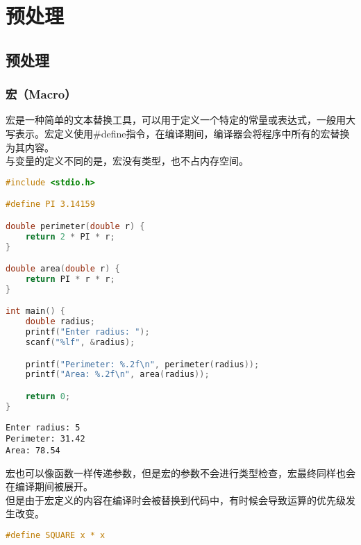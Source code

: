 \chapter{预处理}

\section{预处理}

\subsection{宏（Macro）}

宏是一种简单的文本替换工具，可以用于定义一个特定的常量或表达式，一般用大写表示。宏定义使用\#define指令，在编译期间，编译器会将程序中所有的宏替换为其内容。\\

与变量的定义不同的是，宏没有类型，也不占内存空间。\\


\begin{lstlisting}[language=C]
#include <stdio.h>

#define PI 3.14159

double perimeter(double r) {
    return 2 * PI * r;
}

double area(double r) {
    return PI * r * r;
}

int main() {
    double radius;
    printf("Enter radius: ");
    scanf("%lf", &radius);

    printf("Perimeter: %.2f\n", perimeter(radius));
    printf("Area: %.2f\n", area(radius));

    return 0;
}
\end{lstlisting}

\begin{tcolorbox}
    \begin{verbatim}
Enter radius: 5
Perimeter: 31.42
Area: 78.54
	\end{verbatim}
\end{tcolorbox}

宏也可以像函数一样传递参数，但是宏的参数不会进行类型检查，宏最终同样也会在编译期间被展开。\\

但是由于宏定义的内容在编译时会被替换到代码中，有时候会导致运算的优先级发生改变。

\vspace{-0.5cm}

\begin{lstlisting}[language=C]
#define SQUARE x * x
\end{lstlisting}

